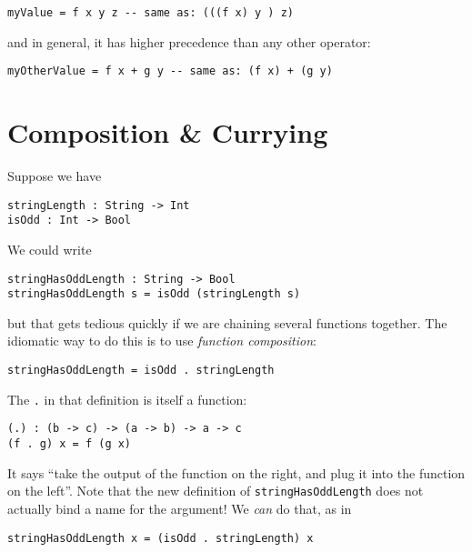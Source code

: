 \documentclass{book}
\newcommand{\mlil}[1]{\lstinline[language=pseudoml,columns=fixed]|#1|}\usepackage{caption}
\begin{document}
\begin{lstlisting}[language=pseudoml]
myValue = f x y z -- same as: (((f x) y ) z)
\end{lstlisting}

\noindent and in general, it has higher precedence than any other operator:

\begin{lstlisting}[language=pseudoml]
myOtherValue = f x + g y -- same as: (f x) + (g y)
\end{lstlisting}

\section{Composition \& Currying}

Suppose we have

\begin{lstlisting}[language=pseudoml]
stringLength : String -> Int
isOdd : Int -> Bool
\end{lstlisting}

We could write

\begin{lstlisting}[language=pseudoml]
stringHasOddLength : String -> Bool
stringHasOddLength s = isOdd (stringLength s)
\end{lstlisting}

\noindent but that gets tedious quickly if we are chaining several functions together. The idiomatic way to do this is to use \emph{function composition}:

\begin{lstlisting}[language=pseudoml]
stringHasOddLength = isOdd . stringLength
\end{lstlisting}

The \mlil{.} in that definition is itself a function:

\begin{lstlisting}[language=pseudoml]
(.) : (b -> c) -> (a -> b) -> a -> c
(f . g) x = f (g x)
\end{lstlisting}

\noindent It says ``take the output of the function on the right, and plug it into the function on the left''. Note that the new definition of \mlil{stringHasOddLength} does not actually bind a name for the argument! We \emph{can} do that, as in

\begin{lstlisting}[language=pseudoml]
stringHasOddLength x = (isOdd . stringLength) x
\end{lstlisting}
\end{document}
